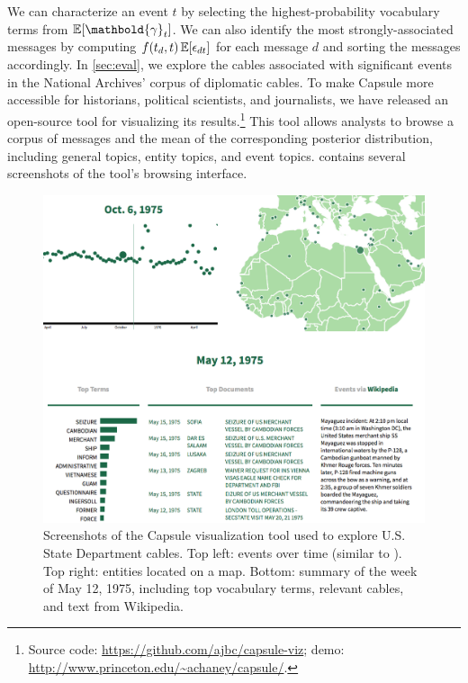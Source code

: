 We can characterize an event  $t$ by selecting the highest-probability
vocabulary terms from $\E[\mathbold{\gamma}_t]$. We can also identify
the most strongly-associated messages by computing $f(t_d,
t)\,\mathbb{E}[\epsilon_{dt}]$ for each message $d$ and sorting the messages
accordingly. In \cref{sec:eval}, we explore the cables associated with
significant events in the National Archives' corpus of diplomatic
cables. To make Capsule more accessible for historians, political
scientists, and journalists, we have released an open-source tool for
visualizing its results.\footnote{Source code:
  \url{https://github.com/ajbc/capsule-viz}; demo:
  \url{http://www.princeton.edu/~achaney/capsule/}.} This tool allows
analysts to browse a corpus of messages and the mean of the
corresponding posterior distribution, including general topics, entity
topics, and event topics.  contains several screenshots of
the tool's browsing interface.

\begin{figure}
\centering
\includegraphics[width=\linewidth]{fig/viz.png}
\caption{Screenshots of the Capsule visualization tool used to explore
  U.S. State Department cables. Top left: events over time (similar to
  ). Top right: entities located on a
  map. Bottom: summary of the week of May 12, 1975, including top
  vocabulary terms, relevant cables, and text from Wikipedia.}
\label{fig:viz}
\end{figure}
